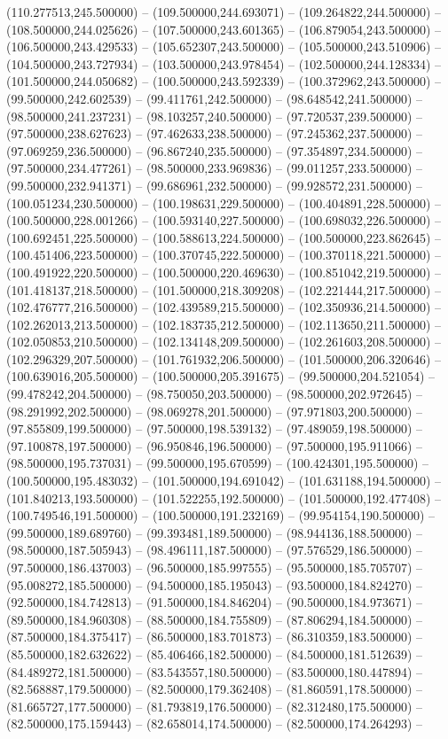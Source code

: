 (110.277513,245.500000) -- (109.500000,244.693071) -- (109.264822,244.500000) -- (108.500000,244.025626) -- (107.500000,243.601365) -- (106.879054,243.500000) -- (106.500000,243.429533) -- (105.652307,243.500000) -- (105.500000,243.510906) -- (104.500000,243.727934) -- (103.500000,243.978454) -- (102.500000,244.128334) -- (101.500000,244.050682) -- (100.500000,243.592339) -- (100.372962,243.500000) -- (99.500000,242.602539) -- (99.411761,242.500000) -- (98.648542,241.500000) -- (98.500000,241.237231) -- (98.103257,240.500000) -- (97.720537,239.500000) -- (97.500000,238.627623) -- (97.462633,238.500000) -- (97.245362,237.500000) -- (97.069259,236.500000) -- (96.867240,235.500000) -- (97.354897,234.500000) -- (97.500000,234.477261) -- (98.500000,233.969836) -- (99.011257,233.500000) -- (99.500000,232.941371) -- (99.686961,232.500000) -- (99.928572,231.500000) -- (100.051234,230.500000) -- (100.198631,229.500000) -- (100.404891,228.500000) -- (100.500000,228.001266) -- (100.593140,227.500000) -- (100.698032,226.500000) -- (100.692451,225.500000) -- (100.588613,224.500000) -- (100.500000,223.862645) -- (100.451406,223.500000) -- (100.370745,222.500000) -- (100.370118,221.500000) -- (100.491922,220.500000) -- (100.500000,220.469630) -- (100.851042,219.500000) -- (101.418137,218.500000) -- (101.500000,218.309208) -- (102.221444,217.500000) -- (102.476777,216.500000) -- (102.439589,215.500000) -- (102.350936,214.500000) -- (102.262013,213.500000) -- (102.183735,212.500000) -- (102.113650,211.500000) -- (102.050853,210.500000) -- (102.134148,209.500000) -- (102.261603,208.500000) -- (102.296329,207.500000) -- (101.761932,206.500000) -- (101.500000,206.320646) -- (100.639016,205.500000) -- (100.500000,205.391675) -- (99.500000,204.521054) -- (99.478242,204.500000) -- (98.750050,203.500000) -- (98.500000,202.972645) -- (98.291992,202.500000) -- (98.069278,201.500000) -- (97.971803,200.500000) -- (97.855809,199.500000) -- (97.500000,198.539132) -- (97.489059,198.500000) -- (97.100878,197.500000) -- (96.950846,196.500000) -- (97.500000,195.911066) -- (98.500000,195.737031) -- (99.500000,195.670599) -- (100.424301,195.500000) -- (100.500000,195.483032) -- (101.500000,194.691042) -- (101.631188,194.500000) -- (101.840213,193.500000) -- (101.522255,192.500000) -- (101.500000,192.477408) -- (100.749546,191.500000) -- (100.500000,191.232169) -- (99.954154,190.500000) -- (99.500000,189.689760) -- (99.393481,189.500000) -- (98.944136,188.500000) -- (98.500000,187.505943) -- (98.496111,187.500000) -- (97.576529,186.500000) -- (97.500000,186.437003) -- (96.500000,185.997555) -- (95.500000,185.705707) -- (95.008272,185.500000) -- (94.500000,185.195043) -- (93.500000,184.824270) -- (92.500000,184.742813) -- (91.500000,184.846204) -- (90.500000,184.973671) -- (89.500000,184.960308) -- (88.500000,184.755809) -- (87.806294,184.500000) -- (87.500000,184.375417) -- (86.500000,183.701873) -- (86.310359,183.500000) -- (85.500000,182.632622) -- (85.406466,182.500000) -- (84.500000,181.512639) -- (84.489272,181.500000) -- (83.543557,180.500000) -- (83.500000,180.447894) -- (82.568887,179.500000) -- (82.500000,179.362408) -- (81.860591,178.500000) -- (81.665727,177.500000) -- (81.793819,176.500000) -- (82.312480,175.500000) -- (82.500000,175.159443) -- (82.658014,174.500000) -- (82.500000,174.264293) -- 